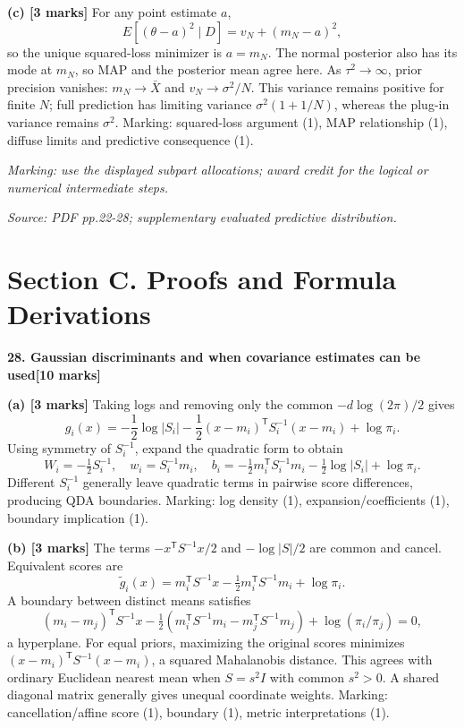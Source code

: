 \documentclass[11pt,a4paper]{article}
\begin{document}
\textbf{(c) [3 marks]} For any point estimate \(a\),
\[
E[(\theta-a)^2\mid D]=v_N+(m_N-a)^2,
\]
so the unique squared-loss minimizer is \(a=m_N\). The normal posterior also has its mode at \(m_N\), so MAP and the posterior mean agree here. As \(\tau^2\to\infty\), prior precision vanishes: \(m_N\to\bar X\) and \(v_N\to\sigma^2/N\). This variance remains positive for finite \(N\); full prediction has limiting variance \(\sigma^2(1+1/N)\), whereas the plug-in variance remains \(\sigma^2\). Marking: squared-loss argument (1), MAP relationship (1), diffuse limits and predictive consequence (1).

\textit{Marking: use the displayed subpart allocations; award credit for the logical or numerical intermediate steps.}\par
{\footnotesize\textit{Source: PDF pp.22-28; supplementary evaluated predictive distribution.}}
\newpage\section*{Section C. Proofs and Formula Derivations}
\textbf{28. Gaussian discriminants and when covariance estimates can be used}\hfill\textbf{[10 marks]}\par\medskip
\textbf{(a) [3 marks]} Taking logs and removing only the common \(-d\log(2\pi)/2\) gives
\[
g_i(x)=-\frac12\log|S_i|-\frac12(x-m_i)^\mathsf TS_i^{-1}(x-m_i)+\log\pi_i.
\]
Using symmetry of \(S_i^{-1}\), expand the quadratic form to obtain
\[
W_i=-\tfrac12S_i^{-1},\quad
w_i=S_i^{-1}m_i,\quad
b_i=-\tfrac12m_i^\mathsf TS_i^{-1}m_i-\tfrac12\log|S_i|+\log\pi_i.
\]
Different \(S_i^{-1}\) generally leave quadratic terms in pairwise score differences, producing QDA boundaries. Marking: log density (1), expansion/coefficients (1), boundary implication (1).

\textbf{(b) [3 marks]} The terms \(-x^\mathsf TS^{-1}x/2\) and \(-\log|S|/2\) are common and cancel. Equivalent scores are
\[
\tilde g_i(x)=m_i^\mathsf TS^{-1}x-\tfrac12m_i^\mathsf TS^{-1}m_i+\log\pi_i.
\]
A boundary between distinct means satisfies
\[
(m_i-m_j)^\mathsf TS^{-1}x
-\tfrac12(m_i^\mathsf TS^{-1}m_i-m_j^\mathsf TS^{-1}m_j)
+\log(\pi_i/\pi_j)=0,
\]
a hyperplane. For equal priors, maximizing the original scores minimizes \((x-m_i)^\mathsf TS^{-1}(x-m_i)\), a squared Mahalanobis distance. This agrees with ordinary Euclidean nearest mean when \(S=s^2I\) with common \(s^2>0\). A shared diagonal matrix generally gives unequal coordinate weights. Marking: cancellation/affine score (1), boundary (1), metric interpretations (1).
\end{document}
